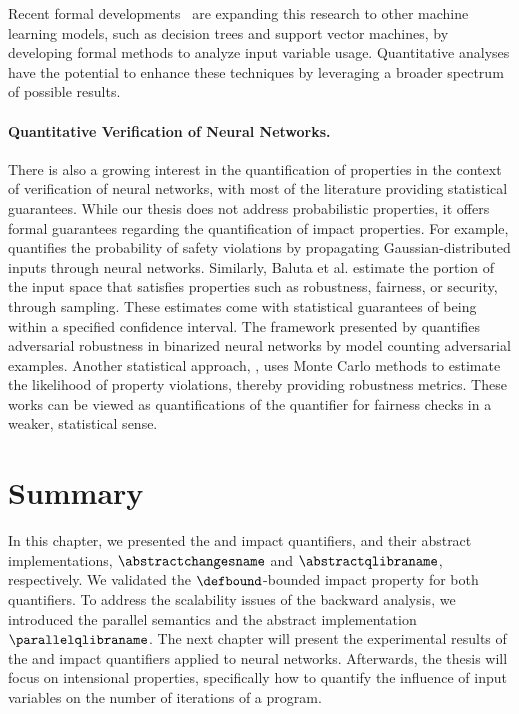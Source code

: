 Recent formal developments~ are expanding this research to other machine learning models, such as decision trees and support vector machines, by developing formal methods to analyze input variable usage. Quantitative analyses have the potential to enhance these techniques by leveraging a broader spectrum of possible results.


\paragraph{Quantitative Verification of Neural Networks.}

There is also a growing interest in the quantification of properties in the context of verification of neural networks, with most of the literature providing statistical guarantees.
While our thesis does not address probabilistic properties, it offers formal guarantees regarding the quantification of impact properties. For example,  quantifies the probability of safety violations by propagating Gaussian-distributed inputs through neural networks. Similarly, Baluta et al.  estimate the portion of the input space that satisfies properties such as robustness, fairness, or security, through sampling. These estimates come with statistical guarantees of being within a specified confidence interval. The framework presented by  quantifies adversarial robustness in binarized neural networks by model counting adversarial examples. Another statistical approach, , uses Monte Carlo methods to estimate the likelihood of property violations, thereby providing robustness metrics. These works can be viewed as quantifications of the \outcomesname{} quantifier for fairness checks in a weaker, statistical sense.


\section{Summary}

In this chapter, we presented the \changesname{} and \qlibraname{} impact quantifiers, and their abstract implementations, $\abstractchangesname$ and $\abstractqlibraname$, respectively.
We validated the $\defbound$-bounded impact property for both quantifiers.
To address the scalability issues of the backward analysis, we introduced the parallel semantics and the abstract implementation $\parallelqlibraname$.
The next chapter will present the experimental results of the \changesname{} and \qlibraname{} impact quantifiers applied to neural networks.
Afterwards, the thesis will focus on intensional properties, specifically how to quantify the influence of input variables on the number of iterations of a program.


